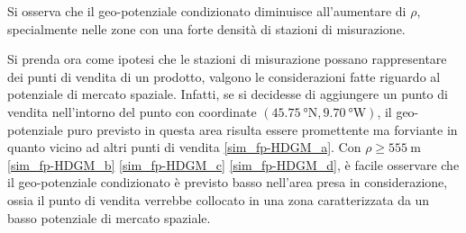 Si osserva che il geo-potenziale condizionato diminuisce all'aumentare di $\rho$, specialmente nelle zone con una forte densità di stazioni di misurazione.
\par Si prenda ora come ipotesi che le stazioni di misurazione possano rappresentare dei punti di vendita di un prodotto, valgono le considerazioni fatte riguardo al potenziale di mercato spaziale. Infatti, se si decidesse di aggiungere un punto di vendita nell'intorno del punto con coordinate $(\SI{45.75}{\degree} \text{N}, \SI{9.70}{\degree} \text{W})$, il geo-potenziale puro previsto in questa area risulta essere promettente ma forviante in quanto vicino ad altri punti di vendita \ref{sim_fp-HDGM_a}. Con $\rho \geq \SI{555}{\meter}$ \ref{sim_fp-HDGM_b} \ref{sim_fp-HDGM_c} \ref{sim_fp-HDGM_d}, è facile osservare che il geo-potenziale condizionato è previsto basso nell'area presa in considerazione, ossia il punto di vendita verrebbe collocato in una zona caratterizzata da un basso potenziale di mercato spaziale.